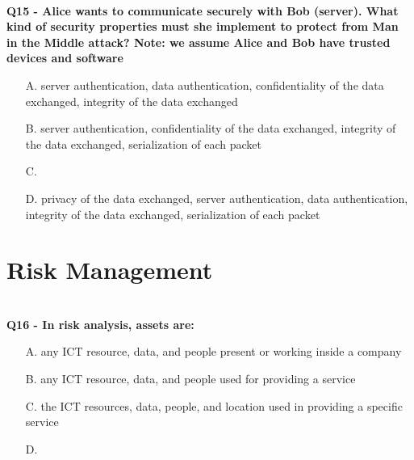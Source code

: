 \textbf{\\Q15 - Alice wants to communicate securely with Bob (server). What kind of security properties must she implement to protect from Man in the Middle attack? Note: we assume Alice and Bob have trusted devices and software}
\begin{enumerate}
    \item[A.] server authentication, data authentication, confidentiality of the data exchanged, integrity of the data exchanged
    \item[B.] server authentication, confidentiality of the data exchanged, integrity of the data exchanged, serialization of each packet
    \item[C.] 
    \item[D.] privacy of the data exchanged, server authentication, data authentication, integrity of the data exchanged, serialization of each packet
\end{enumerate}

\section{Risk Management}


\textbf{\\Q16 - In risk analysis, assets are:}
\begin{enumerate}
    \item[A.] any ICT resource, data, and people present or working inside a company
    \item[B.] any ICT resource, data, and people used for providing a service
    \item[C.] the ICT resources, data, people, and location used in providing a specific service
    \item[D.] 
\end{enumerate}


